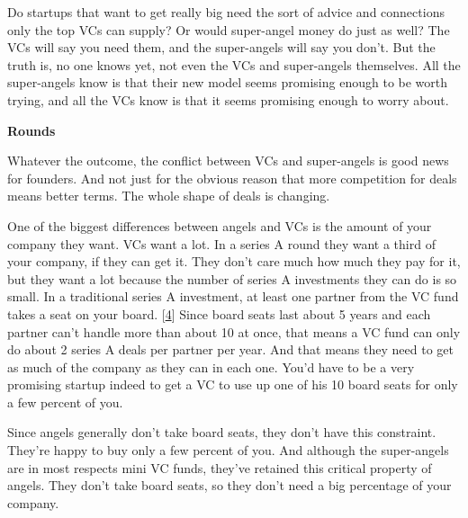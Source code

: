 Do startups that want to get really big need
                    the sort of advice and connections only the top VCs can
                    supply? Or would super-angel money do just as well? The VCs
                    will say you need them, and the super-angels will say you
                    don't. But the truth is, no one knows yet, not even the VCs
                    and super-angels themselves. All the super-angels know is
                    that their new model seems promising enough to be worth
                    trying, and all the VCs know is that it seems promising
                    enough to worry about.

\textbf{Rounds}

Whatever the outcome, the conflict between VCs
                    and super-angels is good news for founders. And not just for
                    the obvious reason that more competition for deals means
                    better terms. The whole shape of deals is changing.

One
                    of the biggest differences between angels and VCs is the
                    amount of your company they want. VCs want a lot. In a
                    series A round they want a third of your company, if they
                    can get it. They don't care much how much they pay for it,
                    but they want a lot because the number of series A
                    investments they can do is so small. In a traditional series
                    A investment, at least one partner from the VC fund takes a
                    seat on your board.
                    [\href{\#f4n}{4}]
                    Since board seats last about 5 years and each partner can't
                    handle more than about 10 at once, that means a VC fund can
                    only do about 2 series A deals per partner per year. And
                    that means they need to get as much of the company as they
                    can in each one. You'd have to be a very promising startup
                    indeed to get a VC to use up one of his 10 board seats for
                    only a few percent of you.

Since angels generally
                    don't take board seats, they don't have this constraint.
                    They're happy to buy only a few percent of you. And although
                    the super-angels are in most respects mini VC funds, they've
                    retained this critical property of angels. They don't take
                    board seats, so they don't need a big percentage of your
                    company.

